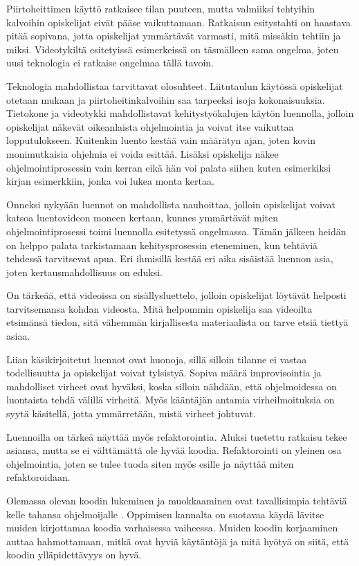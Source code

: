 Piirtoheittimen käyttö ratkaisee tilan puuteen, mutta valmiiksi tehtyihin
kalvoihin opiskelijat eivät pääse vaikuttamaan. Ratkaisun esitystahti on
haastava pitää sopivana, jotta opiskelijat ymmärtävät varmasti, mitä missäkin
tehtiin ja miksi. Videotykiltä esitetyissä esimerkeissä on täsmälleen sama
ongelma, joten uusi teknologia ei ratkaise ongelmaa tällä tavoin.

Teknologia mahdollistaa tarvittavat olosuhteet. Liitutaulun käytössä opiskelijat
otetaan mukaan ja piirtoheitinkalvoihin saa tarpeeksi isoja kokonaisuuksia.
Tietokone ja videotykki mahdollistavat kehitystyökalujen käytön luennolla,
jolloin opiskelijat näkevät oikeanlaista ohjelmointia ja voivat itse vaikuttaa
lopputulokseen. Kuitenkin luento kestää vain määrätyn ajan, joten kovin
monimutkaisia ohjelmia ei voida esittää. Lisäksi opiskelija näkee
ohjelmointiprosessin vain kerran eikä hän voi palata siihen kuten esimerkiksi
kirjan esimerkkiin, jonka voi lukea monta kertaa.

Onneksi nykyään luennot on mahdollista nauhoittaa, jolloin opiskelijat voivat
katsoa luentovideon moneen kertaan, kunnes ymmärtävät miten ohjelmointiprosessi
toimi luennolla esitetyssä ongelmassa. Tämän jälkeen heidän on helppo palata
tarkistamaan kehitysprosessin eteneminen, kun tehtäviä tehdessä tarvitsevat
apua. Eri ihmisillä kestää eri aika sisäistää luennon asia, joten
kertausmahdollisuus on eduksi.

On tärkeää, että videoissa on sisällysluettelo, jolloin opiskelijat löytävät
helposti tarvitsemansa kohdan videosta. Mitä helpommin opiskelija saa videoilta
etsimänsä tiedon, sitä vähemmän kirjallisesta materiaalista on tarve etsiä
tiettyä asiaa.

Liian käsikirjoitetut luennot ovat huonoja, sillä silloin tilanne ei vastaa
todellisuutta ja opiskelijat voivat tylsistyä. Sopiva määrä improvisointia ja
mahdolliset virheet ovat hyväksi, koska silloin nähdään, että ohjelmoidessa on
luontaista tehdä välillä virheitä. Myös kääntäjän antamia virheilmoituksia on
syytä käsitellä, jotta ymmärretään, mistä virheet johtuvat.

Luennoilla on tärkeä näyttää myös refaktorointia. Aluksi tuetettu ratkaisu tekee
asiansa, mutta se ei välttämättä ole hyvää koodia. Refaktorointi on yleinen osa
ohjelmointia, joten se tulee tuoda siten myös esille ja näyttää miten
refaktoroidaan.


Olemassa olevan koodin lukeminen ja muokkaaminen ovat tavallisimpia tehtäviä
kelle tahansa ohjelmoijalle \cite{Kolling:2008}. Oppimisen kannalta on suotavaa
käydä lävitse muiden kirjottamaa koodia varhaisessa vaiheessa. Muiden koodin
korjaaminen auttaa hahmottamaan, mitkä ovat hyviä käytäntöjä ja mitä hyötyä on
siitä, että koodin ylläpidettävyys on hyvä.
